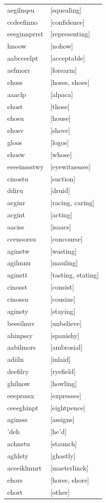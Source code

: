 \documentclass{article}
\begin{document}
\begin{tabular}{ll}
aegilnqsu & [squealing] \\
ccdeefinno & [confidence] \\
eeeginnprrst & [representing] \\
hnoow & [nohow] \\
aabcceelpt & [acceptable] \\
aefmorr & [forearm] \\
ehoss & [hoses, shoes] \\
aaaclp & [alpaca] \\
ehost & [those] \\
ehosu & [house] \\
ehosv & [shove] \\
gloos & [logos] \\
ehosw & [whose] \\
eeeeinssstwy & [eyewitnesses] \\
cinostu & [suction] \\
ddiru & [druid] \\
acginr & [racing, caring] \\
acgint & [acting] \\
aaciss & [isaacs] \\
ccenoorsu & [concourse] \\
aginstw & [wasting] \\
agilmnu & [mauling] \\
aginstt & [tasting, stating] \\
cinosst & [consist] \\
cinossu & [cousins] \\
aginsty & [staying] \\
beeeilnuv & [unbelieve] \\
ahinpssy & [spanishy] \\
aabilmors & [ambrosial] \\
adiiln & [inlaid] \\
deefilry & [ryefield] \\
ghilnow & [howling] \\
eeeprsssx & [expresses] \\
ceeeghinpt & [eightpence] \\
aginsss & [assigns] \\
'deh & [he'd] \\
achnstu & [staunch] \\
aghlsty & [ghastly] \\
aceeiklmnrt & [maeterlinck] \\
ehors & [horse, shore] \\
ehort & [other] \\

\end{tabular}
\end{document}

